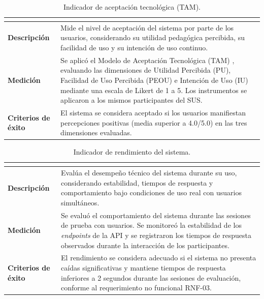 \begin{table}[H]
\centering
\caption{Indicador de aceptación tecnológica (TAM).}
\label{tab:ind_tam}
\footnotesize
\renewcommand{\arraystretch}{1.25}
\begin{tabularx}{\textwidth}{|>{\bfseries}p{3.2cm}|X|}
\hline
\rowcolor{headblue}\multicolumn{2}{|c|}{\textbf{Aceptación tecnológica}}\\\hline
Descripción & Mide el nivel de aceptación del sistema por parte de los usuarios, considerando su utilidad pedagógica percibida, su facilidad de uso y su intención de uso continuo. \\\hline
Medición & Se aplicó el Modelo de Aceptación Tecnológica (TAM) \cite{davis1989tam}, evaluando las dimensiones de Utilidad Percibida (PU), Facilidad de Uso Percibida (PEOU) e Intención de Uso (IU) mediante una escala de Likert de 1 a 5. Los instrumentos se aplicaron a los mismos participantes del SUS. \\\hline
Criterios de éxito & El sistema se considera aceptado si los usuarios manifiestan percepciones positivas (media superior a 4.0/5.0) en las tres dimensiones evaluadas. \\\hline
\end{tabularx}
\end{table}
\fuenteautor

\begin{table}[H]
\centering
\caption{Indicador de rendimiento del sistema.}
\label{tab:ind_rend}
\footnotesize
\renewcommand{\arraystretch}{1.25}
\begin{tabularx}{\textwidth}{|>{\bfseries}p{3.2cm}|X|}
\hline
\rowcolor{headblue}\multicolumn{2}{|c|}{\textbf{Rendimiento técnico}}\\\hline
Descripción & Evalúa el desempeño técnico del sistema durante su uso, considerando estabilidad, tiempos de respuesta y comportamiento bajo condiciones de uso real con usuarios simultáneos. \\\hline
Medición & Se evaluó el comportamiento del sistema durante las sesiones de prueba con usuarios. Se monitoreó la estabilidad de los \textit{endpoints} de la API y se registraron los tiempos de respuesta observados durante la interacción de los participantes. \\\hline
Criterios de éxito & El rendimiento se considera adecuado si el sistema no presenta caídas significativas y mantiene tiempos de respuesta inferiores a 2 segundos durante las sesiones de evaluación, conforme al requerimiento no funcional RNF-03. \\\hline
\end{tabularx}
\end{table}
\fuenteautor

